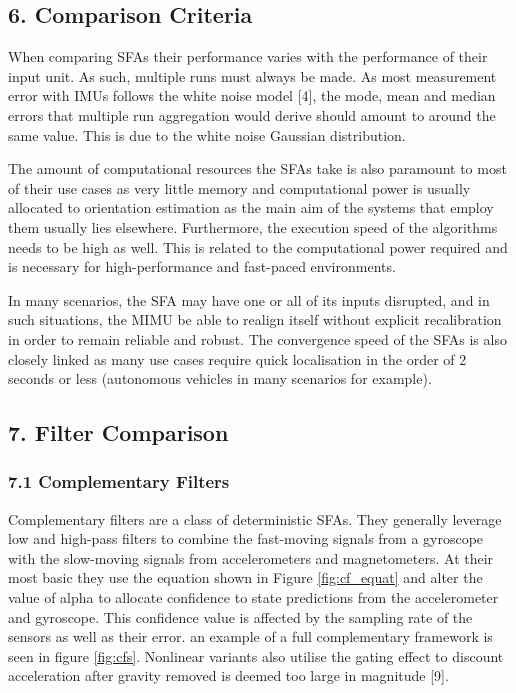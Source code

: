 \documentclass[10pt]{report}
\begin{document}
\subsection*{6. Comparison Criteria}
When comparing SFAs their performance varies with the performance of their input unit. As such, multiple runs must always be made. As most measurement error with IMUs follows the white noise model [4], the mode, mean and median errors that multiple run aggregation would derive should amount to around the same value. This is due to the white noise Gaussian distribution.

The amount of computational resources the SFAs take is also paramount to most of their use cases as very little memory and computational power is usually allocated to orientation estimation as the main aim of the systems that employ them usually lies elsewhere. Furthermore, the execution speed of the algorithms needs to be high as well. This is related to the computational power required and is necessary for high-performance and fast-paced environments.

In many scenarios, the SFA may have one or all of its inputs disrupted, and in such situations, the MIMU be able to realign itself without explicit recalibration in order to remain reliable and robust. The convergence speed of the SFAs is also closely linked as many use cases require quick localisation in the order of 2 seconds or less (autonomous vehicles in many scenarios for example).

\newpage

\subsection*{7. Filter Comparison}
\subsubsection{7.1 Complementary Filters}
Complementary filters are a class of deterministic SFAs. They generally leverage low and high-pass filters to combine the fast-moving signals from a gyroscope with the slow-moving signals from accelerometers and magnetometers. At their most basic they use the equation shown in Figure \ref{fig:cf_equat} and alter the value of alpha to allocate confidence to state predictions from the accelerometer and gyroscope. This confidence value is affected by the sampling rate of the sensors as well as their error. an example of a full complementary framework is seen in figure \ref{fig:cfs}. Nonlinear variants also utilise the gating effect to discount acceleration after gravity removed is deemed too large in magnitude [9].
\end{document}
